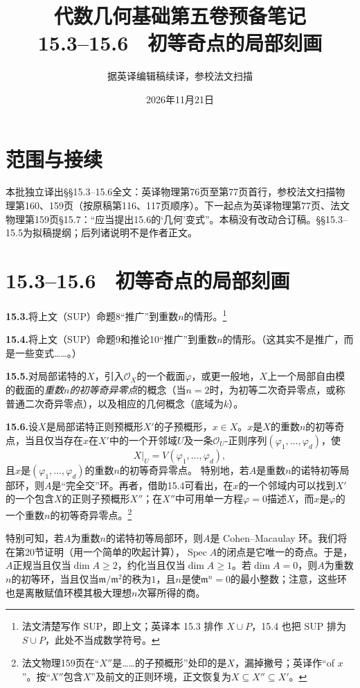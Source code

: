 \documentclass[openany,fontset=fandol]{ctexbook}
\newcommand{\OO}{\mathcal O}
\newcommand{\m}{\mathfrak m}
\DeclareMathOperator{\Spec}{Spec}
\begin{document}
\title{代数几何基础第五卷预备笔记\\15.3--15.6　初等奇点的局部刻画}
\author{据英译编辑稿续译，参校法文扫描}
\date{2026年11月21日}
\maketitle
\chapter*{范围与接续}
本批独立译出§§15.3--15.6全文：英译物理第76页至第77页首行，参校法文扫描物理第160、159页（按原稿第116、117页顺序）。下一起点为英译物理第77页、法文物理第159页§15.7：“应当提出15.6的‘几何’变式”。本稿没有改动合订稿。§§15.3--15.5为拟稿提纲；后列诸说明不是作者正文。
\chapter*{15.3--15.6　初等奇点的局部刻画}
\noindent\textbf{15.3.}\quad 将上文（SUP）命题8“推广”到重数$n$的情形。\footnote{法文清楚写作 SUP，即上文；英译本 15.3 排作 $X\cup P$，15.4 也把 SUP 排为 $S\cup P$，此处不当成数学符号。}

\noindent\textbf{15.4.}\quad 将上文（SUP）命题9和推论10“推广”到重数$n$的情形。（这其实不是推广，而是一些变式……。）

\noindent\textbf{15.5.}\quad 对局部诺特的$X$，引入$\OO_X$的一个截面$\varphi$，或更一般地，$X$上一个局部自由模的截面的\emph{重数$n$的初等奇异零点}的概念（当$n=2$时，为初等二次奇异零点，或称普通二次奇异零点），以及相应的几何概念（底域为$k$）。

\noindent\textbf{15.6.}\quad 设$X$是局部诺特正则预概形$X'$的子预概形，$x\in X$。$x$是$X$的重数$n$的初等奇点，当且仅当存在$x$在$X'$中的一个开邻域$U$及一条$\OO_U$-正则序列$(\varphi_1,\ldots,\varphi_d)$，使
\[
X|_U=V(\varphi_1,\ldots,\varphi_d),
\]
且$x$是$(\varphi_1,\ldots,\varphi_d)$的重数$n$的初等奇异零点。
特别地，若$A$是重数$n$的诺特初等局部环，则$A$是“完全交”环。再者，借助15.4可看出，在$x$的一个邻域内可以找到$X'$的一个包含$X$的正则子预概形$X''$；在$X''$中可用单一方程$\varphi=0$描述$X$，而$x$是$\varphi$的一个重数$n$的初等奇异零点。\footnote{法文物理159页在“$X''$是……的子预概形”处印的是$X$，漏掉撇号；英译作“of $x$”。按“$X''$包含$X$”及前文的正则环境，正文恢复为$X\subseteq X''\subseteq X'$。}

特别可知，若$A$为重数$n$的诺特初等局部环，则$A$是 Cohen--Macaulay 环。我们将在第20节证明（用一个简单的吹起计算），$\Spec A$的闭点是它唯一的奇点。于是，$A$正规当且仅当$\dim A\ge2$，约化当且仅当$\dim A\ge1$。若$\dim A=0$，则$A$为重数$n$的初等环，当且仅当$\m/\m^2$的秩为$1$，且$n$是使$\m^n=0$的最小整数；注意，这些环也是离散赋值环模其极大理想$n$次幂所得的商。
\end{document}
